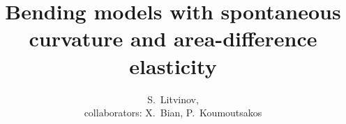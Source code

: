 \author[Litvinov]
{S.~Litvinov, \\ collaborators: 
X.~Bian, P.~Koumoutsakos}
\title{Bending models with spontaneous curvature and area-difference elasticity}
\date{}

